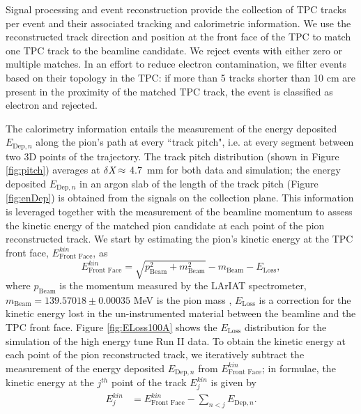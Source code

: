 \documentclass[aps,prl,twocolumn,showpacs,superscriptaddress,groupedaddress]{revtex4}  %
\begin{document}
Signal processing and event reconstruction provide the collection of TPC tracks per event and their associated tracking and calorimetric information. We use the reconstructed track direction and position at the front face of the TPC to match one TPC track to the beamline candidate. We reject events with either zero or multiple matches. In an effort to reduce electron contamination, we filter events based on their topology in the TPC: if more than 5  tracks shorter than 10 cm are present in the proximity of the matched TPC track, the event is classified as electron and rejected. 

The calorimetry information entails the measurement of the energy deposited $E_{\text{Dep},n}$ along the pion's path at every ``track pitch", i.e. at every segment between two 3D points of the trajectory. The track pitch distribution (shown in Figure \ref{fig:pitch}) averages at $\delta {\emph{X}} \approx$ 4.7~mm for both data and simulation;  the energy deposited $E_{\text{Dep},n}$ in an argon slab of the length of the track pitch (Figure \ref{fig:enDep}) is obtained from the signals on the collection plane.  This information is leveraged together with the measurement of the beamline momentum to assess the kinetic energy of the matched pion candidate at each point of the pion reconstructed track. We start by estimating the pion's  kinetic energy at the TPC front face, $ E^{kin}_{\text{Front Face}}$, as 
\begin{equation}
 E^{kin}_{\text{Front Face}}  =  \sqrt{p^2_{\text{Beam}} + m^2_{\text{Beam}}} - m_{\text{Beam}} - E_{\text{Loss}},
\label{eq:enFF}
\end{equation}
where $p_{\text{Beam}}$ is the momentum measured by the LArIAT spectrometer, $m_{\text{Beam}} = 139.57018\pm0.00035$ MeV is the pion mass \cite{Patrignani:2016xqp}, $E_{\text{Loss}}$ is a correction for the kinetic energy lost in the un-instrumented material between the beamline and the TPC front face. Figure \ref{fig:ELoss100A} shows the $E_{\text{Loss}}$ distribution for the simulation of the high energy tune Run II data. To obtain the kinetic energy at each point of the pion reconstructed track, we iteratively subtract the measurement of the energy deposited $E_{\text{Dep},n}$ from $ E^{kin}_{\text{Front Face}}$; in formulae, the kinetic energy at the $j^{th}$ point of the track  $E_{j}^{kin}$ is given by
\begin{equation}
\begin{split}
 E_{j}^{kin}  & = E^{kin}_{\text{Front Face}} -  \sum_{n < j} E_{\text{Dep},n}.
\end{split}
\label{eq:KEj}
\end{equation}
\end{document}
